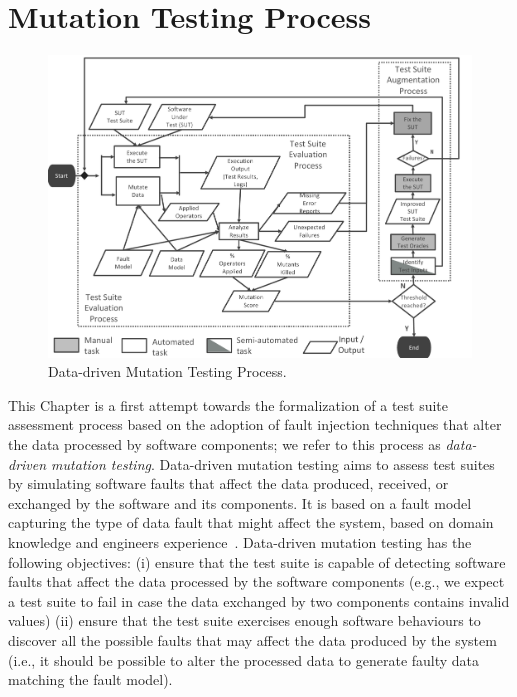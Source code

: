 
\section{Mutation Testing Process}
\label{sec:dataProcess}

	\begin{figure}
	\centering
		\includegraphics[width=\textwidth]{images/dataProcess}
		\caption{Data-driven Mutation Testing Process.}
		\label{fig:data:process}
	\end{figure}



This Chapter is a first attempt towards the formalization of a test suite assessment process based on the adoption of fault injection techniques that alter the data processed by software components; we refer to this process as \emph{data-driven mutation testing}. 
Data-driven mutation testing aims to assess test suites by simulating software faults that affect the data produced, received, or exchanged by the software and its components.
It is based on a fault model capturing the type of data fault that might affect the system, based on domain knowledge and engineers experience~\cite{di2015generating}.
Data-driven mutation testing has the following objectives:
(i) ensure that the test suite is capable of detecting software faults that affect the data processed by the software components 
(e.g., we expect a test suite to fail in case the data exchanged by two components contains invalid values)
(ii) ensure that the test suite exercises enough software behaviours to discover all the possible faults that may affect the data produced by the system
(i.e., it should be possible to alter the processed data to generate faulty data matching the fault model).

